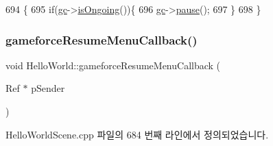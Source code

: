 \begin{DoxyCode}
694                                                        \{
695     \textcolor{keywordflow}{if}(\hyperlink{class_hello_world_a547cb213126911d9a7151f8259dc7102}{gc}->\hyperlink{class_tetris_1_1_game_controller_aecd04e471f7819a8b3f80e0dda748bdc}{isOngoing}())\{
696         \hyperlink{class_hello_world_a547cb213126911d9a7151f8259dc7102}{gc}->\hyperlink{class_tetris_1_1_game_controller_a1f55b577248e34b4e0902ce114610edd}{pause}();
697     \}
698 \}
\end{DoxyCode}
\mbox{\label{class_hello_world_a9765d6e42b96bcf6c025ae1905bd7a90}} 
\subsubsection{\texorpdfstring{gameforce\+Resume\+Menu\+Callback()}{gameforceResumeMenuCallback()}}
{\footnotesize\ttfamily void Hello\+World\+::gameforce\+Resume\+Menu\+Callback (\begin{DoxyParamCaption}\item[{Ref $\ast$}]{p\+Sender }\end{DoxyParamCaption})}



Hello\+World\+Scene.\+cpp 파일의 684 번째 라인에서 정의되었습니다.


